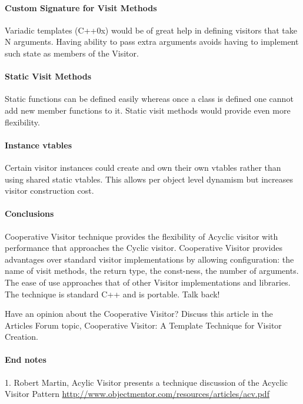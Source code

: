 \documentclass{book}
\begin{document}
\paragraph{Custom Signature for Visit Methods}

Variadic templates (C++0x) would be of great help in defining visitors that take N arguments.
Having ability to pass extra arguments avoids having to implement such state as members of the Visitor.
\paragraph{Static Visit Methods}

Static functions can be defined easily whereas once a class is defined one cannot add new member functions to it. Static visit methods would provide even more flexibility.
\paragraph{Instance vtables}

Certain visitor instances could create and own their own vtables rather than using shared static vtables. This allows per object level dynamism but increases visitor construction cost.

\paragraph{Conclusions}

Cooperative Visitor technique provides the flexibility of Acyclic visitor with performance that approaches the Cyclic visitor.
Cooperative Visitor provides advantages over standard visitor implementations by allowing configuration: the name of visit methods,
the return type, the const-ness, the number of arguments. The ease of use approaches that of other Visitor implementations and libraries. The technique is standard C++ and is portable.
Talk back!

Have an opinion about the Cooperative Visitor? Discuss this article in the Articles Forum topic, Cooperative Visitor: A Template Technique for Visitor Creation.
\paragraph{End notes}

1. Robert Martin, Acylic Visitor presents a technique discussion of the Acyclic Visitor Pattern
\url{http://www.objectmentor.com/resources/articles/acv.pdf}
\end{document}

